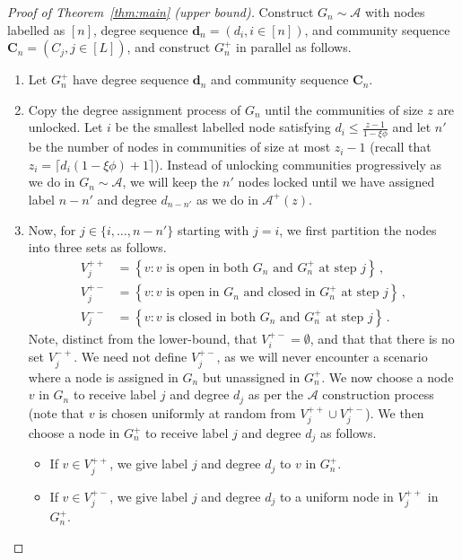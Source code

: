 \documentclass[12pt]{article}
\theoremstyle{definition}
\theoremstyle{remark}
\theoremstyle{remark}
\numberwithin{theorem}{section}
\newcommand{\abcdDist}{\ensuremath{\mathcal{A}}}
\newcommand{\abcdUpper}{\ensuremath{\mathcal{A}^+(z)}}
\begin{document}
\begin{proof}[Proof of Theorem~\ref{thm:main} (upper bound)]
Construct $G_n \sim \abcdDist$ with nodes labelled as $[n]$, degree sequence $\textbf{d}_n = (d_i, i \in [n])$, and community sequence $\textbf{C}_n = (C_j,j \in [L])$, and construct $G_n^+$ in parallel as follows. 
\begin{enumerate}
\item Let $G_n^+$ have degree sequence $\textbf{d}_n$ and community sequence $\textbf{C}_n$. 
\item Copy the degree assignment process of $G_n$ until the communities of size $z$ are unlocked. Let $i$ be the smallest labelled node satisfying $d_i \leq \frac{z-1}{1-\xi \phi}$ and let $n'$ be the number of nodes in communities of size at most $z_i-1$ (recall that $z_i = \lceil d_i(1-\xi \phi) + 1 \rceil$). Instead of unlocking communities progressively as we do in $G_n \sim \abcdDist$, we will keep the $n'$ nodes locked until we have assigned label $n-n'$ and degree $d_{n-n'}$ as we do in $\abcdUpper$. 
\item Now, for $j \in \{i,\dots ,n-n'\}$ starting with $j = i$, we first partition the nodes into three sets as follows. 
\begin{align*}
V_j^{++} &= \left\{ v : v \text{ is open in both } G_n \text{ and } G_n^+ \text{ at step } j \right\} \,, \\
V_j^{+-} &= \left\{ v : v \text{ is open in } G_n \text{ and closed in } G_n^+ \text{ at step } j \right\} \,, \\
V_j^{--} &= \left\{ v : v \text{ is closed in both } G_n \text{ and } G_n^+ \text{ at step } j \right\} \,.
\end{align*}
Note, distinct from the lower-bound, that $V_i^{+-} = \emptyset$, and that that there is no set $V_j^{-+}$. We need not define $V_j^{+-}$, as we will never encounter a scenario where a node is assigned in $G_n$ but unassigned in $G_n^+$. We now choose a node $v$ in $G_n$ to receive label $j$ and degree $d_j$ as per the $\abcdDist$ construction process (note that $v$ is chosen uniformly at random from $V_j^{++} \cup V_j^{+-}$). We then choose a node in $G_n^+$ to receive label $j$ and degree $d_j$ as follows.
\begin{itemize}
\item If $v \in V_j^{++}$, we give label $j$ and degree $d_j$ to $v$ in $G_n^+$.
\item If $v \in V_j^{+-}$, we give label $j$ and degree $d_j$ to a uniform node in $V_j^{++}$ in $G_n^+$. 
\end{itemize}

\end{enumerate}
\end{proof}
\end{document}

